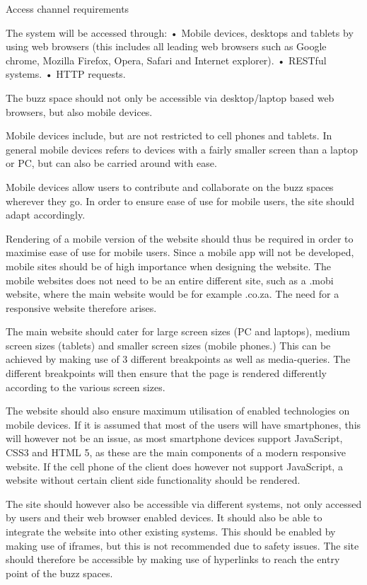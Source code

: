 Access channel requirements

The system will be accessed through:
•	Mobile devices, desktops and tablets by using web browsers (this includes all leading web browsers such as Google chrome, Mozilla Firefox, Opera, Safari and Internet explorer).
•	RESTful systems.
•	HTTP requests.

The buzz space should not only be accessible via desktop/laptop based web browsers, but also mobile devices.

Mobile devices include, but are not restricted to cell phones and tablets. In general mobile devices refers to devices with a fairly smaller screen than a laptop or PC, but can also be carried around with ease. 

Mobile devices allow users to contribute and collaborate on the buzz spaces wherever they go. In order to ensure ease of use for mobile users, the site should adapt accordingly.

Rendering of a mobile version of the website should thus be required in order to maximise ease of use for mobile users. Since a mobile app will not be developed, mobile sites should be of high importance when designing the website. The mobile websites does not need to be an entire different site, such as a .mobi website, where the main website would be for example .co.za. The need for a responsive website therefore arises.
 
The main website should cater for large screen sizes (PC and laptops), medium screen sizes (tablets) and smaller screen sizes (mobile phones.) This can be achieved by making use of 3 different breakpoints as well as media-queries. The different breakpoints will then ensure that the page is rendered differently according to the various screen sizes. 

The website should also ensure maximum utilisation of enabled technologies on mobile devices. If it is assumed that most of the users will have smartphones, this will however not be an issue, as most smartphone devices support JavaScript, CSS3 and HTML 5, as these are the main components of a modern responsive website. If the cell phone of the client does however not support JavaScript, a website without certain client side functionality should be rendered.

The site should however also be accessible via different systems, not only accessed by users and their web browser enabled devices. It should also be able to integrate the website into other existing systems. This should be enabled by making use of iframes, but this is not recommended due to safety issues. The site should therefore be accessible by making use of hyperlinks to reach the entry point of the buzz spaces.
